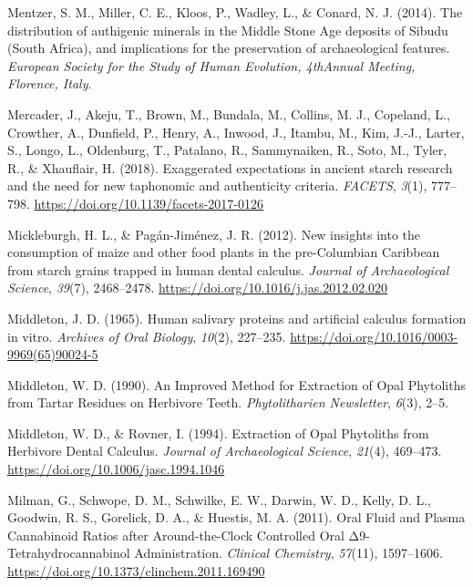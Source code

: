 \documentclass[
  letterpaper,
]{book}
\newlength{\cslhangindent}
\newlength{\cslentryspacingunit} %
\newenvironment{CSLReferences}[2] %
 {%
  \setlength{\parindent}{0pt}
  \ifodd #1
  \let\oldpar\par
  \def\par{\hangindent=\cslhangindent\oldpar}
  \fi
  \setlength{\parskip}{#2\cslentryspacingunit}
 }%
 {}
\begin{document}
\begin{CSLReferences}{1}{0}
\leavevmode{}%
Mentzer, S. M., Miller, C. E., Kloos, P., Wadley, L., \& Conard, N. J.
(2014). The distribution of authigenic minerals in the {Middle Stone
Age} deposits of {Sibudu} ({South Africa}), and implications for the
preservation of archaeological features. \emph{European Society for the
Study of Human Evolution, {4thAnnual} Meeting, Florence, Italy}.

\leavevmode{}%
Mercader, J., Akeju, T., Brown, M., Bundala, M., Collins, M. J.,
Copeland, L., Crowther, A., Dunfield, P., Henry, A., Inwood, J., Itambu,
M., Kim, J.-J., Larter, S., Longo, L., Oldenburg, T., Patalano, R.,
Sammynaiken, R., Soto, M., Tyler, R., \& Xhauflair, H. (2018).
Exaggerated expectations in ancient starch research and the need for new
taphonomic and authenticity criteria. \emph{FACETS}, \emph{3}(1),
777--798. \url{https://doi.org/10.1139/facets-2017-0126}

\leavevmode{}%
Mickleburgh, H. L., \& Pagán-Jiménez, J. R. (2012). New insights into
the consumption of maize and other food plants in the pre-{Columbian
Caribbean} from starch grains trapped in human dental calculus.
\emph{Journal of Archaeological Science}, \emph{39}(7), 2468--2478.
\url{https://doi.org/10.1016/j.jas.2012.02.020}

\leavevmode{}%
Middleton, J. D. (1965). Human salivary proteins and artificial calculus
formation in vitro. \emph{Archives of Oral Biology}, \emph{10}(2),
227--235. \url{https://doi.org/10.1016/0003-9969(65)90024-5}

\leavevmode{}%
Middleton, W. D. (1990). An {Improved Method} for {Extraction} of {Opal
Phytoliths} from {Tartar Residues} on {Herbivore Teeth}.
\emph{Phytolitharien Newsletter}, \emph{6}(3), 2--5.

\leavevmode{}%
Middleton, W. D., \& Rovner, I. (1994). Extraction of {Opal Phytoliths}
from {Herbivore Dental Calculus}. \emph{Journal of Archaeological
Science}, \emph{21}(4), 469--473.
\url{https://doi.org/10.1006/jasc.1994.1046}

\leavevmode{}%
Milman, G., Schwope, D. M., Schwilke, E. W., Darwin, W. D., Kelly, D.
L., Goodwin, R. S., Gorelick, D. A., \& Huestis, M. A. (2011). Oral
{Fluid} and {Plasma Cannabinoid Ratios} after {Around-the-Clock
Controlled Oral Δ9-Tetrahydrocannabinol Administration}. \emph{Clinical
Chemistry}, \emph{57}(11), 1597--1606.
\url{https://doi.org/10.1373/clinchem.2011.169490}


\end{CSLReferences}
\end{document}
